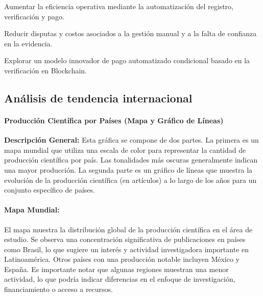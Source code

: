 Aumentar la eficiencia operativa mediante la automatización del registro, verificación y pago. 

Reducir disputas y costos asociados a la gestión manual y a la falta de confianza en la evidencia. 

Explorar un modelo innovador de pago automatizado condicional basado en la verificación en Blockchain. 

\subsection{Análisis de tendencia internacional}
\paragraph{Producción Científica por Países (Mapa y Gráfico de Líneas) }
 
 \textbf{Descripción General:} Esta gráfica se compone de dos partes. La primera es un mapa mundial que utiliza una escala de color para representar la cantidad de producción científica por país. Las tonalidades más oscuras generalmente indican una mayor producción. La segunda parte es un gráfico de líneas que muestra la evolución de la producción científica (en artículos) a lo largo de los años para un conjunto específico de países. 
\paragraph{Mapa Mundial:}
El mapa muestra la distribución global de la producción científica en el área de estudio. Se observa una concentración significativa de publicaciones en países como Brasil, lo que sugiere un interés y actividad investigadora importante en Latinoamérica. Otros países con una producción notable incluyen México y España. Es importante notar que algunas regiones muestran una menor actividad, lo que podría indicar diferencias en el enfoque de investigación, financiamiento o acceso a recursos. 

